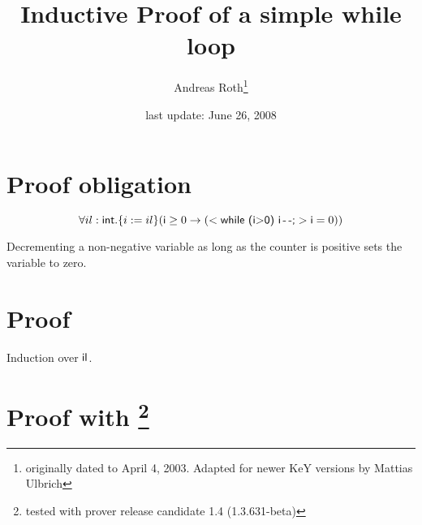 \documentclass[11pt]{article}
\newcommand{\java}[1]{\mbox{\textsf{#1}}}
\begin{document}
\title{Inductive Proof of a simple while loop}
\author{Andreas Roth\footnote{originally dated to April 4, 2003. Adapted for newer KeY versions by Mattias Ulbrich}}
\date{last update: June 26, 2008}
\maketitle

\section*{Proof obligation}
\[ \forall il:\java{int}. \{i:=il\}(\java{i}\geq 0 \rightarrow ( <\java{while (i$>$0) i\,-\,-;}> \java{i}=0))\]

\noindent Decrementing a non-negative variable as long as the counter is
positive sets the variable to zero.

\section*{Proof}

Induction over $\java{il}$.

\section*{Proof with \KeY\footnote{tested with prover release candidate 1.4 (1.3.631-beta)}}
\end{document}

